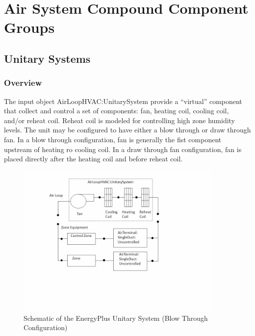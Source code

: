 \section{Air System Compound Component Groups }\label{air-system-compound-component-groups}

\subsection{Unitary Systems}\label{unitary-systems}

\subsubsection{Overview}\label{overview-000}

The input object AirLoopHVAC:UnitarySystem provide a ``virtual'' component that collect and control a set of components: fan, heating coil, cooling coil, and/or reheat coil. Reheat coil is modeled for controlling high zone humidity levels. The unit may be configured to have either a blow through or draw through fan. In a blow through configuration, fan is generally the fist component upstream of heating ro cooling coil. In a draw through fan configuration, fan is placed directly after the heating coil and before reheat coil.

\begin{figure}[hbtp] %
\centering
\includegraphics[width=0.9\textwidth, height=0.9\textheight, keepaspectratio=true]{media/image4930.png}
\caption{Schematic of the EnergyPlus Unitary System (Blow Through Configuration) \protect \label{fig:schematic-of-the-energyplus-unitary-system}}
\end{figure}

